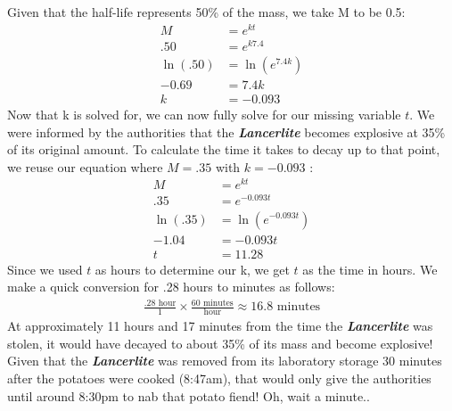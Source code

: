 \documentclass{article}
\begin{document}
Given that the half-life represents 50\% of the mass, we take M to be 0.5:
\begin{align}
    M &= e^{kt}\\[1em]
    .50 &= e^{k7.4}\\[1em]
    \ln(.50) &= \ln(e^{7.4k})\\[1em]
    -0.69 &= 7.4k \\[1em]
    k &= -0.093
\end{align}
Now that k is solved for, we can now fully solve for our missing variable $t$. We were informed by the authorities that the \textbf{\textit{Lancerlite}} becomes explosive at 35\% of its original amount. To calculate the time it takes to decay up to that point, we reuse our equation where $M = .35$ with $k = -0.093$ :
\begin{align}
    M &= e^{kt}\\[1em]
    .35 &= e^{-0.093t}\\[1em]
    \ln(.35) &= \ln(e^{-0.093t})\\[1em]
    -1.04 &= -0.093t \\[1em]
    t &= 11.28
\end{align}
Since we used $t$ as hours to determine our k, we get $t$ as the time in hours. We make a quick conversion for .28 hours to minutes as follows:
\begin{align}
	\frac{.28 \text{ hour}}{1} \times \frac{60 \text{ minutes}}{\text{hour}} \approx 16.8 \text{ minutes}
\end{align}
At approximately 11 hours and 17 minutes from the time the \textbf{\textit{Lancerlite}} was stolen, it would have decayed to about 35\% of its mass and become explosive! Given that the \textbf{\textit{Lancerlite}} was removed from its laboratory storage 30 minutes after the potatoes were cooked (8:47am), that would only give the authorities until around 8:30pm to nab that potato fiend! Oh, wait a minute..
\end{document}
